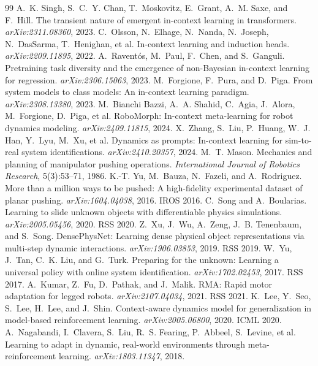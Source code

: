 \documentclass{article}
\begin{document}
\begin{thebibliography}{99}
 A.~K. Singh, S.~C.~Y. Chan, T.~Moskovitz, E.~Grant, A.~M. Saxe, and F.~Hill. The transient nature of emergent in-context learning in transformers. \emph{arXiv:2311.08360}, 2023.
 C.~Olsson, N.~Elhage, N.~Nanda, N.~Joseph, N.~DasSarma, T.~Henighan, et al. In-context learning and induction heads. \emph{arXiv:2209.11895}, 2022.
 A.~Ravent\'os, M.~Paul, F.~Chen, and S.~Ganguli. Pretraining task diversity and the emergence of non-Bayesian in-context learning for regression. \emph{arXiv:2306.15063}, 2023.
 M.~Forgione, F.~Pura, and D.~Piga. From system models to class models: An in-context learning paradigm. \emph{arXiv:2308.13380}, 2023.
 M.~Bianchi Bazzi, A.~A. Shahid, C.~Agia, J.~Alora, M.~Forgione, D.~Piga, et al. RoboMorph: In-context meta-learning for robot dynamics modeling. \emph{arXiv:2409.11815}, 2024.
 X.~Zhang, S.~Liu, P.~Huang, W.~J. Han, Y.~Lyu, M.~Xu, et al. Dynamics as prompts: In-context learning for sim-to-real system identifications. \emph{arXiv:2410.20357}, 2024.
 M.~T. Mason. Mechanics and planning of manipulator pushing operations. \emph{International Journal of Robotics Research}, 5(3):53--71, 1986.
 K.-T. Yu, M.~Bauza, N.~Fazeli, and A.~Rodriguez. More than a million ways to be pushed: A high-fidelity experimental dataset of planar pushing. \emph{arXiv:1604.04038}, 2016. IROS 2016.
 C.~Song and A.~Boularias. Learning to slide unknown objects with differentiable physics simulations. \emph{arXiv:2005.05456}, 2020. RSS 2020.
 Z.~Xu, J.~Wu, A.~Zeng, J.~B. Tenenbaum, and S.~Song. DensePhysNet: Learning dense physical object representations via multi-step dynamic interactions. \emph{arXiv:1906.03853}, 2019. RSS 2019.
 W.~Yu, J.~Tan, C.~K. Liu, and G.~Turk. Preparing for the unknown: Learning a universal policy with online system identification. \emph{arXiv:1702.02453}, 2017. RSS 2017.
 A.~Kumar, Z.~Fu, D.~Pathak, and J.~Malik. RMA: Rapid motor adaptation for legged robots. \emph{arXiv:2107.04034}, 2021. RSS 2021.
 K.~Lee, Y.~Seo, S.~Lee, H.~Lee, and J.~Shin. Context-aware dynamics model for generalization in model-based reinforcement learning. \emph{arXiv:2005.06800}, 2020. ICML 2020.
 A.~Nagabandi, I.~Clavera, S.~Liu, R.~S. Fearing, P.~Abbeel, S.~Levine, et al. Learning to adapt in dynamic, real-world environments through meta-reinforcement learning. \emph{arXiv:1803.11347}, 2018.

\end{thebibliography}
\end{document}
